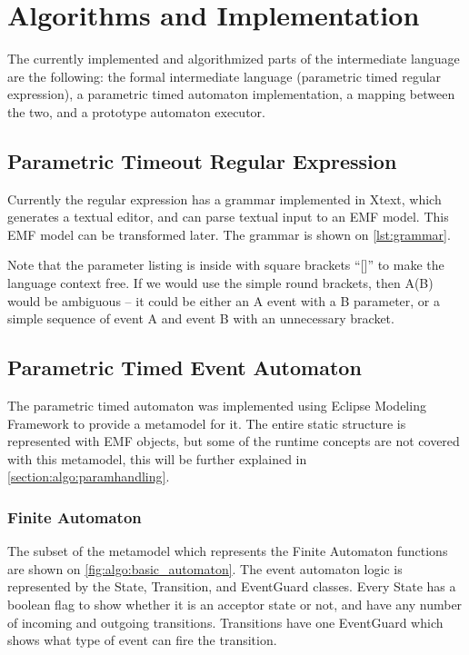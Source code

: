 \chapter{Algorithms and Implementation}

The currently implemented and algorithmized parts of the intermediate language are the following: the formal intermediate language (parametric timed regular expression), a parametric timed automaton implementation, a mapping between the two, and a prototype automaton executor.

\section{Parametric Timeout Regular Expression}

Currently the regular expression has a grammar implemented in Xtext, which generates a textual editor, and can parse textual input to an EMF model. This EMF model can be transformed later. 
The grammar is shown on \cref{lst:grammar}. 

Note that the parameter listing is inside with square brackets ``[]'' to make the language context free. If we would use the simple round brackets, then A(B) would be ambiguous -- it could be either an A event with a B parameter, or a simple sequence of event A and event B with an unnecessary bracket.

\section{Parametric Timed Event Automaton}

The parametric timed automaton was implemented using Eclipse Modeling Framework to provide a metamodel for it. The entire static structure is represented with EMF objects, but some of the runtime concepts are not covered with this metamodel, this will be further explained in \cref{section:algo:paramhandling}.

\subsection{Finite Automaton}

The subset of the metamodel which represents the Finite Automaton functions are shown on \cref{fig:algo:basic_automaton}.
The event automaton logic is represented by the State, Transition, and EventGuard classes.
Every State has a boolean flag to show whether it is an acceptor state or not, and have any number of incoming and outgoing transitions.
Transitions have one EventGuard which shows what type of event can fire the transition. 

